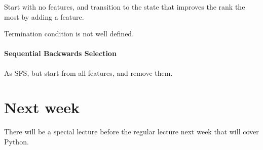 \documentclass{idc_msc}
\begin{document}
Start with no features, and transition to the state that improves the rank the most by adding a feature.

Termination condition is not well defined.

\paragraph{Sequential Backwards Selection}

As SFS, but start from all features, and remove them.

\section{Next week}

There will be a special lecture before the regular lecture next week that will cover Python.
\end{document}
